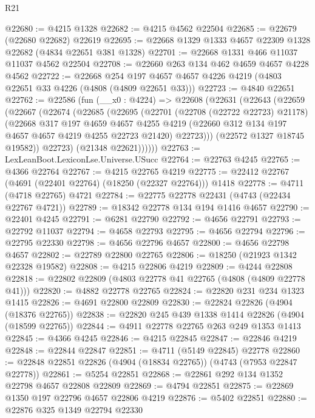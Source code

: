 \begin{lexlean}{R21}
\begin{coremodule}
@22680 := @4215 @1328
@22682 := @4215 @4562 @22504
@22685 := @22679 (@22680 @22682) @22619
@22695 := @22668 @1329 @1333 @4657 @22309 @1328 @22682 (@4834 @22651 @381 @1328)
@22701 := @22668 @1331 @466 @11037 @11037 @4562 @22504
@22708 := @22660 @263 @134 @462 @4659 @4657 @4228 @4562
@22722 := @22668
    @254
    @197
    @4657
    @4657
    @4226
    @4219
    (@4803 @22651 @33 @4226 (@4808 (@4809 @22651 @33)))
@22723 := @4840 @22651
@22762 := @22586
    (fun (__x0 : @4224) =>
    @22608
      (@22631
        (@22643
          (@22659
            (@22667
              (@22674
                (@22685
                  (@22695
                    (@22701
                      (@22708 (@22722 @22723) @21178)
                      (@22668
                        @317
                        @197
                        @4659
                        @4657
                        @4255
                        @4219
                        (@22660 @312 @134 @197 @4657 @4657 @4219 @4255 @22723 @21420)
                        @22723)))
                  (@22572 @1327 @18745 @19582))
                @22723)
              (@21348 @22621))))))
@22763 := LexLeanBoot.LexiconLse.Universe.USucc
@22764 := @22763 @4245
@22765 := @4366 @22764
@22767 := @4215 @22765 @4219
@22775 := @22412 @22767 (@4691 (@22401 @22764) (@18250 (@22327 @22764))) @1418
@22778 := @4711 (@4718 @22765) @4721
@22784 := @22775 @22778 @22431 (@4743 (@22434 @22767 @4721))
@22789 := @18342 @22778 @134 @194 @1416 @4657
@22790 := @22401 @4245
@22791 := @6281 @22790
@22792 := @4656 @22791
@22793 := @22792 @11037
@22794 := @4658 @22793
@22795 := @4656 @22794
@22796 := @22795 @22330
@22798 := @4656 @22796 @4657
@22800 := @4656 @22798 @4657
@22802 := @22789 @22800 @22765
@22806 := @18250 (@21923 @1342 @22328 @19582)
@22808 := @4215 @22806 @4219
@22809 := @4244 @22808
@22818 := @22802 @22809 (@4803 @22778 @41 @22765 (@4808 (@4809 @22778 @41)))
@22820 := @4882 @22778 @22765
@22824 := @22820 @231 @234 @1323 @1415
@22826 := @4691 @22800 @22809
@22830 := @22824 @22826 (@4904 (@18376 @22765))
@22838 := @22820 @245 @439 @1338 @1414 @22826 (@4904 (@18599 @22765))
@22844 := @4911 @22778 @22765 @263 @249 @1353 @1413
@22845 := @4366 @4245
@22846 := @4215 @22845
@22847 := @22846 @4219
@22848 := @22844 @22847
@22851 := @4711 (@5149 @22845) @22778
@22860 := @22848 @22851 @22826 (@4904 (@18834 @22765)) (@4743 (@7953 @22847 @22778))
@22861 := @5254 @22851
@22868 := @22861 @292 @134 @1352 @22798 @4657 @22808 @22809
@22869 := @4794 @22851
@22875 := @22869 @1350 @197 @22796 @4657 @22806 @4219
@22876 := @5402 @22851
@22880 := @22876 @325 @1349 @22794 @22330

\end{coremodule}
\end{lexlean}
